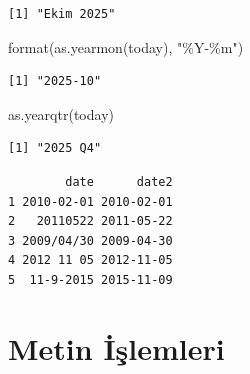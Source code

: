 \documentclass[
  letterpaper,
  DIV=11,
  numbers=noendperiod]{scrreprt}
\newenvironment{Shaded}{\begin{snugshade}}{\end{snugshade}}
\newcommand{\AttributeTok}[1]{\textcolor[rgb]{0.40,0.45,0.13}{#1}}
\newcommand{\CommentTok}[1]{\textcolor[rgb]{0.37,0.37,0.37}{#1}}
\newcommand{\FunctionTok}[1]{\textcolor[rgb]{0.28,0.35,0.67}{#1}}
\newcommand{\NormalTok}[1]{\textcolor[rgb]{0.00,0.23,0.31}{#1}}
\newcommand{\OtherTok}[1]{\textcolor[rgb]{0.00,0.23,0.31}{#1}}
\newcommand{\SpecialCharTok}[1]{\textcolor[rgb]{0.37,0.37,0.37}{#1}}
\newcommand{\StringTok}[1]{\textcolor[rgb]{0.13,0.47,0.30}{#1}}
\begin{document}
\begin{verbatim}
[1] "Ekim 2025"
\end{verbatim}

\begin{Shaded}
\begin{Highlighting}[]
\FunctionTok{format}\NormalTok{(}\FunctionTok{as.yearmon}\NormalTok{(today), }\StringTok{"\%Y{-}\%m"}\NormalTok{)}
\end{Highlighting}
\end{Shaded}

\begin{verbatim}
[1] "2025-10"
\end{verbatim}

\begin{Shaded}
\begin{Highlighting}[]
\FunctionTok{as.yearqtr}\NormalTok{(today)}
\end{Highlighting}
\end{Shaded}

\begin{verbatim}
[1] "2025 Q4"
\end{verbatim}

\begin{Shaded}
\end{Shaded}

\begin{verbatim}
        date      date2
1 2010-02-01 2010-02-01
2   20110522 2011-05-22
3 2009/04/30 2009-04-30
4 2012 11 05 2012-11-05
5  11-9-2015 2015-11-09
\end{verbatim}

\chapter{Metin İşlemleri}\label{metin-iux15flemleri}
\end{document}
